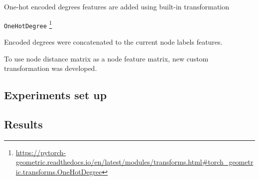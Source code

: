 One-hot encoded degrees features are added using built-in transformation

\texttt{OneHotDegree}
\footnote{\url{https://pytorch-geometric.readthedocs.io/en/latest/modules/transforms.html\#torch_geometric.transforms.OneHotDegree}}

Encoded degrees were concatenated to the current node labels features.

To use node distance matrix as a node feature matrix, new custom transformation was developed.


\subsection{Experiments set up}




\subsection{Results}





